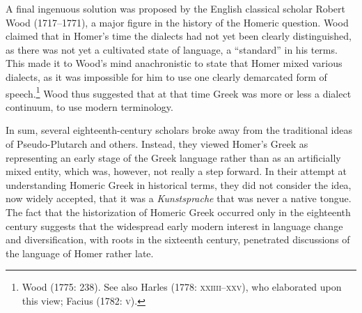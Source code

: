 \begin{styleStandard}
A final ingenuous solution was proposed by the English classical scholar Robert Wood (1717–1771), a major figure in the history of the Homeric question. Wood claimed that in Homer’s time the dialects had not yet been clearly distinguished, as there was not yet a cultivated state of language, a “standard” in his terms. This made it to Wood’s mind anachronistic to state that Homer mixed various dialects, as it was impossible for him to use one clearly demarcated form of speech.\footnote{ Wood (1775: 238). See also Harles (1778: \textsc{xxiiii–xxv)}, who elaborated upon this view; Facius (1782: \textsc{v}).} Wood thus suggested that at that time Greek was more or less a dialect continuum, to use modern terminology.
\end{styleStandard}

\begin{styleStandard}
In sum, several eighteenth-century scholars broke away from the traditional ideas of Pseudo-Plutarch and others. Instead, they viewed Homer’s Greek as representing an early stage of the Greek language rather than as an artificially mixed entity, which was, however, not really a step forward. In their attempt at understanding Homeric Greek in historical terms, they did not consider the idea, now widely accepted, that it was a \textit{Kunstsprache} that was never a native tongue. The fact that the historization of Homeric Greek occurred only in the eighteenth century suggests that the widespread early modern interest in language change and diversification, with roots in the sixteenth century, penetrated discussions of the language of Homer rather late.
\end{styleStandard}

